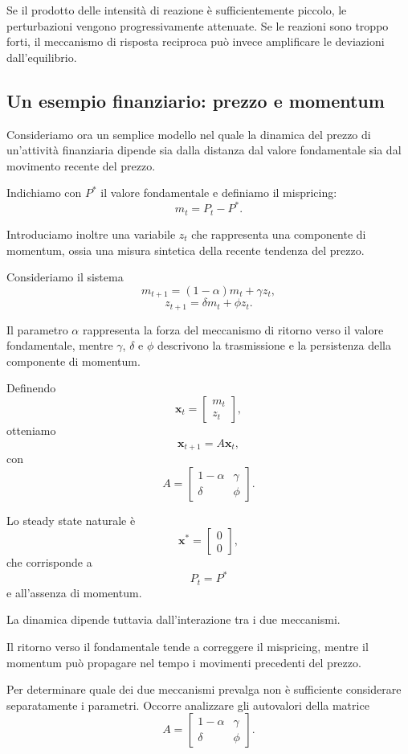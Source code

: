 \documentclass{book}
\begin{document}
Se il prodotto delle intensità di reazione è sufficientemente piccolo, le
perturbazioni vengono progressivamente attenuate. Se le reazioni sono
troppo forti, il meccanismo di risposta reciproca può invece amplificare le
deviazioni dall'equilibrio.


\subsection{Un esempio finanziario: prezzo e momentum}

Consideriamo ora un semplice modello nel quale la dinamica del prezzo di
un'attività finanziaria dipende sia dalla distanza dal valore fondamentale
sia dal movimento recente del prezzo.

Indichiamo con $P^*$ il valore fondamentale e definiamo il mispricing:
\[
m_t=P_t-P^*.
\]

Introduciamo inoltre una variabile $z_t$ che rappresenta una componente di
momentum, ossia una misura sintetica della recente tendenza del prezzo.

Consideriamo il sistema
\[
m_{t+1}
=
(1-\alpha)m_t+\gamma z_t,
\]
\[
z_{t+1}
=
\delta m_t+\phi z_t.
\]

Il parametro $\alpha$ rappresenta la forza del meccanismo di ritorno verso
il valore fondamentale, mentre $\gamma$, $\delta$ e $\phi$ descrivono la
trasmissione e la persistenza della componente di momentum.

Definendo
\[
\mathbf{x}_t=
\begin{bmatrix}
m_t\\
z_t
\end{bmatrix},
\]
otteniamo
\[
\mathbf{x}_{t+1}
=
A\mathbf{x}_t,
\]
con
\[
A=
\begin{bmatrix}
1-\alpha&\gamma\\
\delta&\phi
\end{bmatrix}.
\]

Lo steady state naturale è
\[
\mathbf{x}^*
=
\begin{bmatrix}
0\\
0
\end{bmatrix},
\]
che corrisponde a
\[
P_t=P^*
\]
e all'assenza di momentum.

La dinamica dipende tuttavia dall'interazione tra i due meccanismi.

Il ritorno verso il fondamentale tende a correggere il mispricing, mentre
il momentum può propagare nel tempo i movimenti precedenti del prezzo.

Per determinare quale dei due meccanismi prevalga non è sufficiente
considerare separatamente i parametri. Occorre analizzare gli autovalori
della matrice
\[
A=
\begin{bmatrix}
1-\alpha&\gamma\\
\delta&\phi
\end{bmatrix}.
\]
\end{document}
